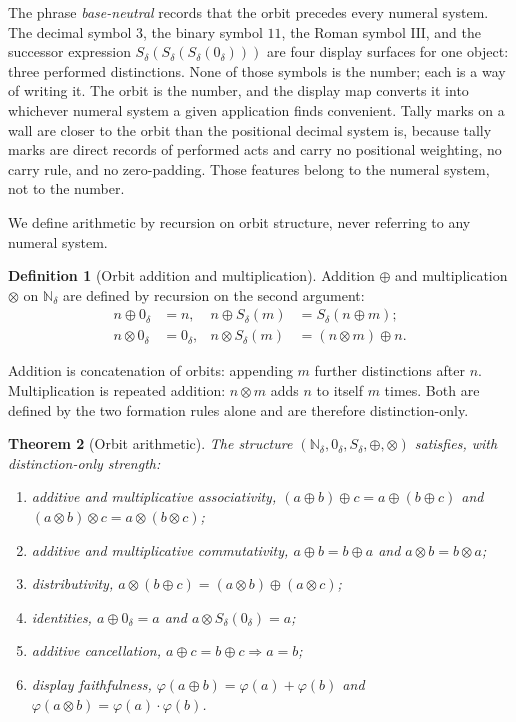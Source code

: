 \documentclass[11pt,a4paper]{article}
\newtheorem{theorem}{Theorem}[section]
\theoremstyle{definition}
\newtheorem{definition}[theorem]{Definition}
\theoremstyle{remark}
\newcommand{\Nd}{\mathbb{N}_\delta}
\newcommand{\Sd}{S_\delta}
\newcommand{\zd}{0_\delta}
\newcommand{\oad}{\oplus}
\newcommand{\omd}{\otimes}
\begin{document}
The phrase \emph{base-neutral} records that the orbit precedes every numeral
system. The decimal symbol $3$, the binary symbol $11$, the Roman symbol
$\mathrm{III}$, and the successor expression $\Sd(\Sd(\Sd(\zd)))$ are four
display surfaces for one object: three performed distinctions. None of those
symbols is the number; each is a way of writing it. The orbit is the number, and
the display map converts it into whichever numeral system a given application
finds convenient. Tally marks on a wall are closer to the orbit than the
positional decimal system is, because tally marks are direct records of
performed acts and carry no positional weighting, no carry rule, and no
zero-padding. Those features belong to the numeral system, not to the number.

We define arithmetic by recursion on orbit structure, never referring to any
numeral system.

\begin{definition}[Orbit addition and multiplication]\label{def:orbitops}
Addition $\oad$ and multiplication $\omd$ on $\Nd$ are defined by recursion on
the second argument:
\begin{align}
  n \oad \zd &= n, &
  n \oad \Sd(m) &= \Sd(n \oad m); \label{eq:add}\\
  n \omd \zd &= \zd, &
  n \omd \Sd(m) &= (n \omd m) \oad n. \label{eq:mul}
\end{align}
\end{definition}

Addition is concatenation of orbits: appending $m$ further distinctions after
$n$. Multiplication is repeated addition: $n \omd m$ adds $n$ to itself $m$
times. Both are defined by the two formation rules alone and are therefore
distinction-only.

\begin{theorem}[Orbit arithmetic]\label{thm:orbit}
The structure $(\Nd, \zd, \Sd, \oad, \omd)$ satisfies, with distinction-only
strength:
\begin{enumerate}[leftmargin=2em, label=\textup{(\alph*)}]
  \item additive and multiplicative associativity,
    $(a \oad b) \oad c = a \oad (b \oad c)$ and
    $(a \omd b) \omd c = a \omd (b \omd c)$;
  \item additive and multiplicative commutativity,
    $a \oad b = b \oad a$ and $a \omd b = b \omd a$;
  \item distributivity, $a \omd (b \oad c) = (a \omd b) \oad (a \omd c)$;
  \item identities, $a \oad \zd = a$ and $a \omd \Sd(\zd) = a$;
  \item additive cancellation, $a \oad c = b \oad c \Rightarrow a = b$;
  \item display faithfulness, $\varphi(a \oad b) = \varphi(a) + \varphi(b)$ and
    $\varphi(a \omd b) = \varphi(a) \cdot \varphi(b)$.
\end{enumerate}
\end{theorem}
\end{document}
